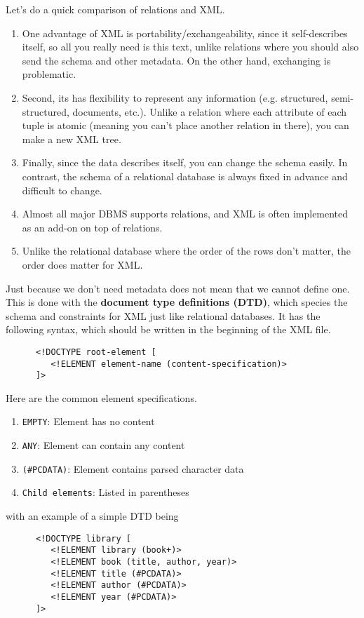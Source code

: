   Let's do a quick comparison of relations and XML. 
  \begin{enumerate}
    \item One advantage of XML is portability/exchangeability, since it self-describes itself, so all you really need is this text, unlike relations where you should also send the schema and other metadata. On the other hand, exchanging is problematic. 
    \item Second, its has flexibility to represent any information (e.g. structured, semi-structured, documents, etc.). Unlike a relation where each attribute of each tuple is atomic (meaning you can't place another relation in there), you can make a new XML tree. 
    \item Finally, since the data describes itself, you can change the schema easily. In contrast, the schema of a relational database is always fixed in advance and difficult to change. 
    \item Almost all major DBMS supports relations, and XML is often implemented as an add-on on top of relations. 
    \item Unlike the relational database where the order of the rows don't matter, the order does matter for XML. 
  \end{enumerate}
  
  \begin{definition}[DTD]
    Just because we don't need metadata does not mean that we cannot define one. This is done with the \textbf{document type definitions (DTD)}, which species the schema and constraints for XML just like relational databases. It has the following syntax, which should be written in the beginning of the XML file. 
    \begin{lstlisting}
      <!DOCTYPE root-element [
         <!ELEMENT element-name (content-specification)>
      ]> 
    \end{lstlisting} 
    Here are the common element specifications. 
    \begin{enumerate}
      \item \texttt{EMPTY}: Element has no content
      \item \texttt{ANY}: Element can contain any content
      \item \texttt{(\#PCDATA)}: Element contains parsed character data
      \item \texttt{Child elements}: Listed in parentheses
    \end{enumerate}
    with an example of a simple DTD being 
    \begin{lstlisting}
      <!DOCTYPE library [
         <!ELEMENT library (book+)>
         <!ELEMENT book (title, author, year)>
         <!ELEMENT title (#PCDATA)>
         <!ELEMENT author (#PCDATA)>
         <!ELEMENT year (#PCDATA)>
      ]> 
    \end{lstlisting}
  \end{definition}

